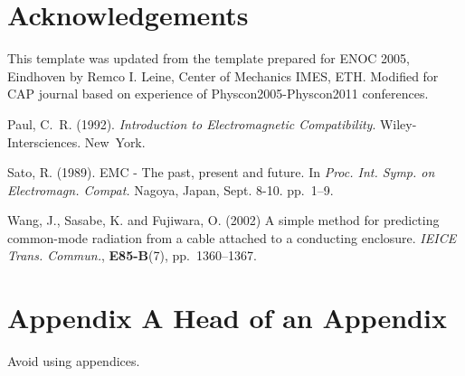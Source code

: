 \documentclass[twocolumn]{CAP-journal}
\begin{document}
\section*{Acknowledgements}
This template was updated from the template prepared for ENOC
2005, Eindhoven by Remco I. Leine, Center of Mechanics IMES, ETH.
Modified  for CAP journal based on experience of Physcon2005-Physcon2011 conferences.
\begin{thebibliography}{}

 Paul, C.~R. (1992). {\em Introduction to Electromagnetic Compatibility}. Wiley-Intersciences. New~York.

 Sato, R. (1989). EMC - The past, present and future. In {\em Proc. Int. Symp. on Electromagn. Compat.} Nagoya, Japan, Sept. 8-10. pp.~1--9.

 Wang, J., Sasabe, K. and Fujiwara, O. (2002)  A simple method for predicting common-mode radiation from a cable attached to a conducting enclosure. {\em \mbox{IEICE} Trans. Commun.}, \textbf{E85-B}(7), pp.~1360--1367.

\end{thebibliography}
%



\appendix       %
\section*{Appendix A\; Head of an Appendix}
Avoid using appendices.
\end{document}
